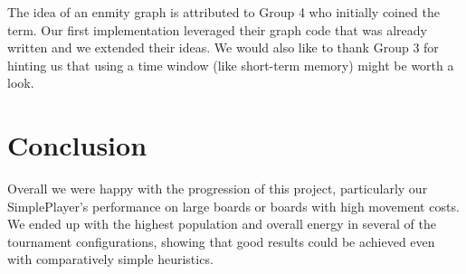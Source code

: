 \documentclass[
10pt, %
letterpaper, %
oneside, %
headinclude,footinclude, %
english
]{article}
\begin{document}
The idea of an enmity graph is attributed to Group 4 who initially coined the term. Our first implementation leveraged their graph code that was already written and we extended their ideas. We would also like to thank Group 3 for hinting us that using a time window (like short-term memory) might be worth a look. 

\section{Conclusion}

Overall we were happy with the progression of this project, particularly our SimplePlayer's performance on large boards or boards with high movement costs. We ended up with the highest population and overall energy in several of the tournament configurations, showing that good results could be achieved even with comparatively simple heuristics.
\end{document}
